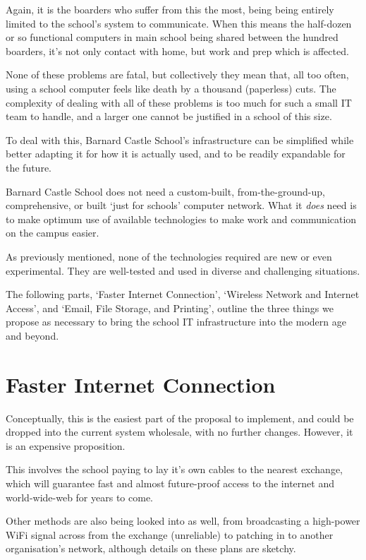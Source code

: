 \documentclass[a4paper,leqno,titlepage]{article}
\begin{document}
Again, it is the boarders who suffer from this the most, being being entirely
limited to the school's system to communicate. When this means the
half-dozen or so functional computers in main school being shared between the
hundred boarders, it's not only contact with home,
but work and prep which is affected.


None of these problems are fatal, but collectively they mean that, all too often,
using a school computer feels like death by a thousand (paperless) cuts.
The complexity of dealing with all of these problems is too much for such a
small IT team to handle, and a larger one cannot be justified in a school of
this size.


To deal with this, Barnard Castle School's infrastructure can be simplified
while better adapting it for how it is actually used, and to be
readily expandable for the future.


Barnard Castle School does not need a custom-built, from-the-ground-up,
comprehensive, or built `just for schools' computer network.
What it \emph{does} need is to make optimum use of available technologies
to make work and communication on the campus easier.


As previously mentioned, none of the technologies required are new or even
experimental. They are well-tested and used in diverse and challenging
situations.

The following parts,
`Faster Internet Connection',
`Wireless Network and Internet Access',
and `Email, File Storage, and Printing',
outline the three things we propose as necessary to bring the school IT
infrastructure into the modern age and beyond.






\section{Faster Internet Connection}


Conceptually, this is the easiest part of the proposal to implement,
and could be dropped into the current system wholesale, with no further changes.
However, it is an expensive proposition.


This involves the school paying to lay it's own cables to the nearest exchange,
which will guarantee fast and almost future-proof access to the internet and
world-wide-web for years to come.


Other methods are also being looked into as well, from broadcasting a high-power
WiFi signal across from the exchange (unreliable) to patching in to another
organisation's network, although details on these plans are sketchy.
\end{document}
